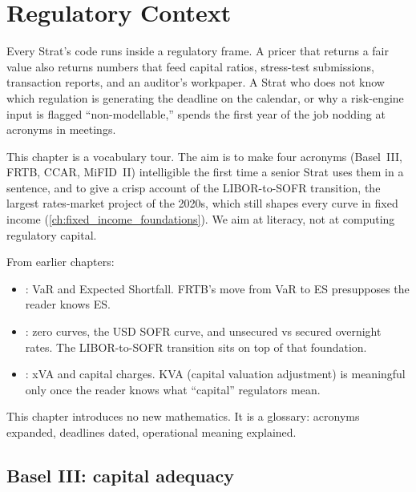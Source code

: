 \chapter{Regulatory Context}
\label{ch:regulatory}

Every Strat's code runs inside a regulatory frame.  A pricer that
returns a fair value also returns numbers that feed capital
ratios, stress-test submissions, transaction reports, and an
auditor's workpaper.  A Strat who does not know which regulation
is generating the deadline on the calendar, or why a risk-engine
input is flagged ``non-modellable,'' spends the first year of the
job nodding at acronyms in meetings.

This chapter is a vocabulary tour.  The aim is to make four
acronyms (Basel~III, FRTB, CCAR, MiFID~II) intelligible the
first time a senior Strat uses them in a sentence, and to give a
crisp account of the LIBOR-to-SOFR transition, the largest
rates-market project of the 2020s, which still shapes every curve
in fixed income (\cref{ch:fixed_income_foundations}).  We aim at
literacy, not at computing regulatory capital.

\begin{backgroundbox}[Prerequisites]
From earlier chapters:
\begin{itemize}
  \item {}: VaR and Expected Shortfall.  FRTB's
    move from VaR to ES presupposes the reader knows ES.
  \item {}: zero curves, the USD
    SOFR curve, and unsecured vs secured overnight rates.  The
    LIBOR-to-SOFR transition sits on top of that foundation.
  \item {}: xVA and capital charges.  KVA
    (capital valuation adjustment) is meaningful only once the
    reader knows what ``capital'' regulators mean.
\end{itemize}
This chapter introduces no new mathematics.  It is a glossary:
acronyms expanded, deadlines dated, operational meaning explained.
\end{backgroundbox}


\section{Basel III: capital adequacy}
\label{sec:basel3}


